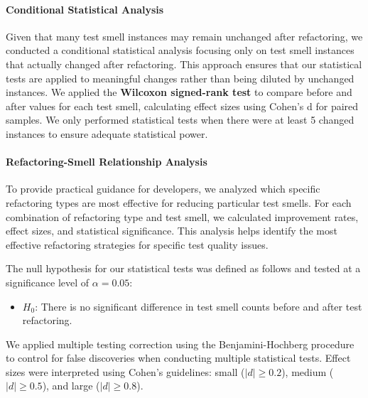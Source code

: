 \paragraph{Conditional Statistical Analysis}
Given that many test smell instances may remain unchanged after refactoring, we conducted a conditional statistical analysis focusing only on test smell instances that actually changed after refactoring. This approach ensures that our statistical tests are applied to meaningful changes rather than being diluted by unchanged instances. We applied the \textbf{Wilcoxon signed-rank test} to compare before and after values for each test smell, calculating effect sizes using Cohen's d for paired samples. We only performed statistical tests when there were at least 5 changed instances to ensure adequate statistical power.

\paragraph{Refactoring-Smell Relationship Analysis}
To provide practical guidance for developers, we analyzed which specific refactoring types are most effective for reducing particular test smells. For each combination of refactoring type and test smell, we calculated improvement rates, effect sizes, and statistical significance. This analysis helps identify the most effective refactoring strategies for specific test quality issues.

The null hypothesis for our statistical tests was defined as follows and tested at a significance level of $\alpha = 0.05$:
\begin{itemize}
    \item $H_0$: There is no significant difference in test smell counts before and after test refactoring.
\end{itemize}

We applied multiple testing correction using the Benjamini-Hochberg procedure to control for false discoveries when conducting multiple statistical tests. Effect sizes were interpreted using Cohen's guidelines: small ($|d| \geq 0.2$), medium ($|d| \geq 0.5$), and large ($|d| \geq 0.8$).

